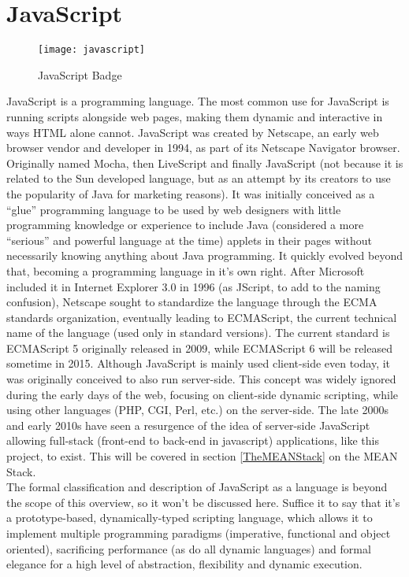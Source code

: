 \section{JavaScript} \label{JavaScript}
\begin{figure}[h]
\centering
\texttt{[image: javascript]}
\caption{JavaScript Badge}
\end{figure}
JavaScript is a programming language. The most common use for JavaScript is running scripts alongside web pages, making
them dynamic and interactive in ways HTML alone cannot. JavaScript was created by Netscape, an early web browser vendor
and developer in 1994, as part of its Netscape Navigator browser. Originally named Mocha, then LiveScript and finally
JavaScript (not because it is related to the Sun developed language, but as an attempt by its creators to use the
popularity of Java for marketing reasons). It was initially conceived as a ``glue'' programming language to be used by
web designers with little programming knowledge or experience to include Java (considered a more ``serious'' and powerful
language at the time) applets in their pages without necessarily knowing anything about Java programming. It quickly
evolved beyond that, becoming a programming language in it's own right. After Microsoft included it in Internet Explorer
3.0 in 1996 (as JScript, to add to the naming confusion), Netscape sought to standardize the language through the ECMA
standards organization, eventually leading to ECMAScript, the current technical name of the language (used only in
standard versions). The current standard is ECMAScript 5 originally released in 2009, while ECMAScript 6 will be released
sometime in 2015. Although JavaScript is mainly used client-side even today, it was originally conceived to also run
server-side. This concept was widely ignored during the early days of the web, focusing on client-side dynamic scripting,
while using other languages (PHP, CGI, Perl, etc.) on the server-side. The late 2000s and early 2010s have seen a
resurgence of the idea of server-side JavaScript allowing full-stack (front-end to back-end in javascript) applications,
like this project, to exist. This will be covered in section \ref{TheMEANStack} on the MEAN Stack.\\

The formal classification and description of JavaScript as a language is beyond the scope of this overview, so it won't
be discussed here. Suffice it to say that it's a prototype-based, dynamically-typed scripting language, which allows it
to implement multiple programming paradigms (imperative, functional and object oriented), sacrificing performance (as do
all dynamic languages) and formal elegance for a high level of abstraction, flexibility and dynamic execution.\\

